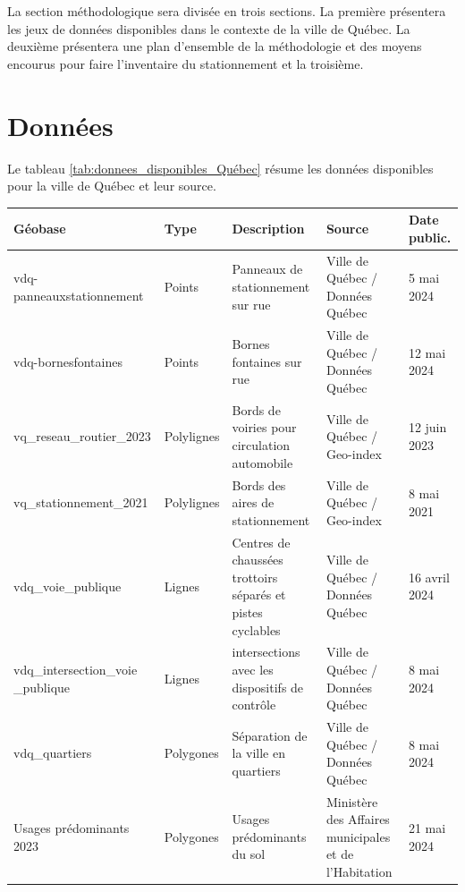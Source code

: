 \label{sec:Methodologie}


La section méthodologique sera divisée en trois sections. La première présentera les jeux de données disponibles dans le contexte de la ville de Québec. La deuxième présentera une plan d'ensemble de la méthodologie et des moyens encourus pour faire l'inventaire du stationnement et la troisième.


\section{Données}
Le tableau \ref{tab:donnees_disponibles_Québec} résume les données disponibles pour la ville de Québec et leur source.
\begin{landscape}
\begin{table}[h!]
  \centering
   \begin{tabular}{p{.2 \linewidth} l p{.3 \linewidth} p{.15\linewidth} l } 
   \hline
   Géobase & Type & Description  & Source & Date public.\\ 
   \hline
   vdq-panneauxstationnement    & Points        & Panneaux de stationnement sur rue          & Ville de Québec / Données Québec  & 5 mai 2024 \\
   \hline
   vdq-bornesfontaines          & Points        & Bornes fontaines sur rue                   & Ville de Québec / Données Québec & 12 mai 2024 \\
   \hline
   vq\_reseau\_routier\_2023 & Polylignes    & Bords de voiries pour circulation automobile  & Ville de Québec / Geo-index  & 12 juin 2023\\ 
   \hline
   vq\_stationnement\_2021  & Polylignes    & Bords des aires de stationnement           & Ville de Québec / Geo-index & 8 mai 2021\\
   \hline
   vdq\_voie\_publique            & Lignes        & Centres de chaussées trottoirs séparés et pistes cyclables & Ville de Québec / Données Québec & 16 avril 2024 \\
   \hline
   vdq\_intersection\_voie \_publique & Lignes & intersections avec les dispositifs de contrôle & Ville de Québec / Données Québec & 8 mai 2024 \\
   \hline
   vdq\_quartiers & Polygones &Séparation de la ville en quartiers & Ville de Québec / Données Québec & 8 mai 2024\\
   \hline
   Usages prédominants 2023  & Polygones & Usages prédominants du sol &   Ministère des Affaires municipales et de l'Habitation & 21 mai 2024 \\

\end{tabular}
\end{table}
\end{landscape}
